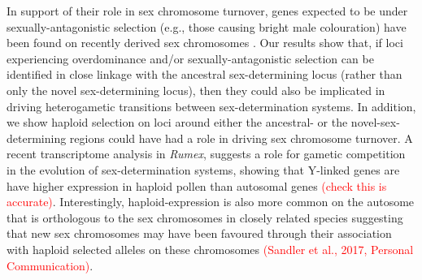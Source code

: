 \documentclass[12pt]{article}
\begin{document}
In support of their role in sex chromosome turnover, genes expected to be under sexually-antagonistic selection (e.g., those causing bright male colouration) have been found on recently derived sex chromosomes \citep{Lindholm:2002dw,Tripathi:2009cw,Ser:2010iq}. 
Our results show that, if loci experiencing overdominance and/or sexually-antagonistic selection can be identified in close linkage with the ancestral sex-determining locus (rather than only the novel sex-determining locus), then they could also be implicated in driving heterogametic transitions between sex-determination systems. 
 In addition, we show haploid selection on loci around either the ancestral- or the novel-sex-determining regions could have had a role in driving sex chromosome turnover. 
A recent transcriptome analysis in \textit{Rumex}, suggests a role for gametic competition in the evolution of sex-determination systems, showing that Y-linked genes are have higher expression in haploid pollen than autosomal genes \textcolor{red}{(check this is accurate)}.
Interestingly, haploid-expression is also more common on the autosome that is orthologous to the sex chromosomes in closely related species suggesting that new sex chromosomes may have been favoured through their association with haploid selected alleles on these chromosomes \textcolor{red}{(Sandler et al., 2017, Personal Communication)}.
\end{document}
